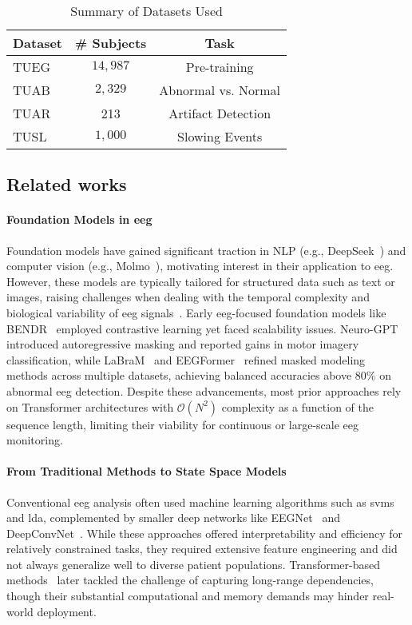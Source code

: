 \begin{table}[t]
    \centering
    \caption{Summary of Datasets Used}
    \label{tab:dataset_summary}
    \begin{tabular}{lcc}
        \hline
        \textbf{Dataset} & \textbf{\# Subjects} & \textbf{Task} \\
        \hline
        TUEG & $14{,}987$ & Pre-training \\
        TUAB & $2{,}329$ & Abnormal vs. Normal \\
        TUAR & 213 & Artifact Detection \\
        TUSL & $1{,}000$ & Slowing Events \\
        \hline
    \end{tabular}
\end{table}

\subsection{Related works}
\paragraph*{Foundation Models in \gls{eeg}}
Foundation models have gained significant traction in NLP (e.g., DeepSeek~\cite{wu2024deepseek}) and computer vision (e.g., Molmo~\cite{deitke2024molmo}), motivating interest in their application to \gls{eeg}. However, these models are typically tailored for structured data such as text or images, raising challenges when dealing with the temporal complexity and biological variability of \gls{eeg} signals~\cite{cui2024toward}. Early \gls{eeg}-focused foundation models like BENDR~\cite{kostas_bendr_2021} employed contrastive learning yet faced scalability issues. Neuro-GPT~\cite{cui_neuro-gpt_2024} introduced autoregressive masking and reported gains in motor imagery classification, while LaBraM~\cite{jianglarge} and EEGFormer~\cite{chen2024eegformer} refined masked modeling methods across multiple datasets, achieving balanced accuracies above 80\% on abnormal \gls{eeg} detection. Despite these advancements, most prior approaches rely on Transformer architectures with $\mathcal{O}(N^2)$ complexity as a function of the sequence length, limiting their viability for continuous or large-scale \gls{eeg} monitoring.


\paragraph*{From Traditional Methods to State Space Models}
Conventional \gls{eeg} analysis often used machine learning algorithms such as \glspl{svm} and \gls{lda}, complemented by smaller deep networks like EEGNet~\cite{lawhern2018eegnet} and DeepConvNet~\cite{schirrmeister2017deep}. While these approaches offered interpretability and efficiency for relatively constrained tasks, they required extensive feature engineering and did not always generalize well to diverse patient populations. Transformer-based methods~\cite{jianglarge,chen2024eegformer,cui_neuro-gpt_2024,kostas_bendr_2021} later tackled the challenge of capturing long-range dependencies, though their substantial computational and memory demands may hinder real-world deployment.

